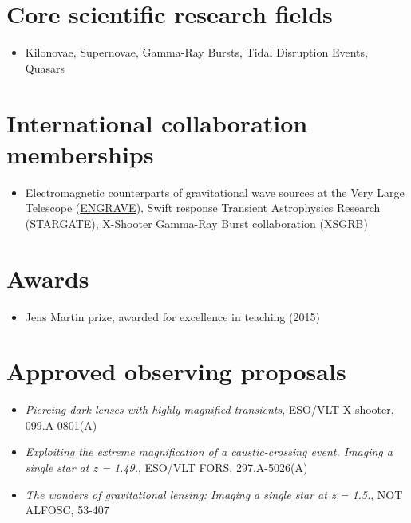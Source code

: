 \documentclass[12pt,letterpaper]{article}
\begin{document}
\section*{Core scientific research  fields}

\begin{itemize}
	\item Kilonovae, Supernovae, Gamma-Ray Bursts, Tidal Disruption Events, Quasars
\end{itemize}


\section*{International collaboration memberships}

\begin{itemize}
	\item Electromagnetic counterparts of gravitational wave sources at the Very Large Telescope (\href{http://www.engrave-eso.org}{ENGRAVE}), Swift response Transient Astrophysics Research (STARGATE), X-Shooter Gamma-Ray Burst collaboration (XSGRB)
\end{itemize}


\section*{Awards}

	\begin{itemize}
    \item Jens Martin prize, awarded for excellence in teaching (2015)
	\end{itemize}

%

\section*{Approved observing proposals}

	\begin{itemize}
    \item {\it Piercing dark lenses with highly magnified transients}, ESO/VLT X-shooter,  099.A-0801(A)
    \item {\it Exploiting the extreme magnification of a caustic-crossing event. Imaging a single star at z = 1.49.}, ESO/VLT FORS,  297.A-5026(A)
    \item {\it The wonders of gravitational lensing: Imaging a single star at z = 1.5.}, NOT ALFOSC,  53-407
	\end{itemize}
\end{document}
